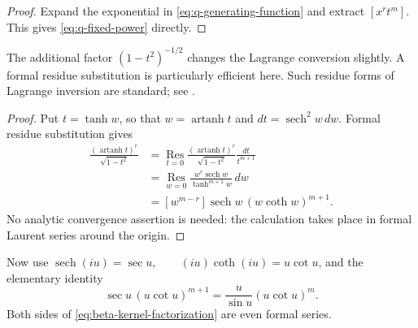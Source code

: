 \documentclass[11pt,twoside]{article}
\begin{document}

\begin{proof}
Expand the exponential in \eqref{eq:q-generating-function} and extract
$[x^rt^m]$.  This gives \eqref{eq:q-fixed-power} directly.
\end{proof}

The additional factor $(1-t^2)^{-1/2}$ changes the Lagrange conversion
slightly.  A formal residue substitution is particularly efficient
here.  Such residue forms of Lagrange inversion are standard; see
\cite{Comtet1974,FlajoletSedgewick2009,Gessel2016,SuryaWarnke2023}.


\begin{proof}
Put $t=\tanh w$, so that $w=\operatorname{artanh}t$ and
$dt=\operatorname{sech}^2w\,dw$.  Formal residue substitution gives
\begin{align*}
[t^m]\frac{(\operatorname{artanh}t)^r}{\sqrt{1-t^2}}
&=\operatorname*{Res}_{t=0}
\frac{(\operatorname{artanh}t)^r}{\sqrt{1-t^2}}
\frac{dt}{t^{m+1}}\\
&=\operatorname*{Res}_{w=0}
\frac{w^r\operatorname{sech}w}{\tanh^{m+1}w}\,dw\\
&=[w^{m-r}]\operatorname{sech}w\,(w\coth w)^{m+1}.
\end{align*}
No analytic convergence assertion is needed: the calculation takes
place in formal Laurent series around the origin.
\end{proof}

Now use
\(\operatorname{sech}(iu)=\sec u, \qquad (iu)\coth(iu)=u\cot u\),
and the elementary identity
\begin{equation}
\label{eq:beta-kernel-factorization}
\sec u\,(u\cot u)^{m+1}
=
\frac{u}{\sin u}(u\cot u)^m.
\end{equation}
Both sides of \eqref{eq:beta-kernel-factorization} are even formal
series.
\end{document}
